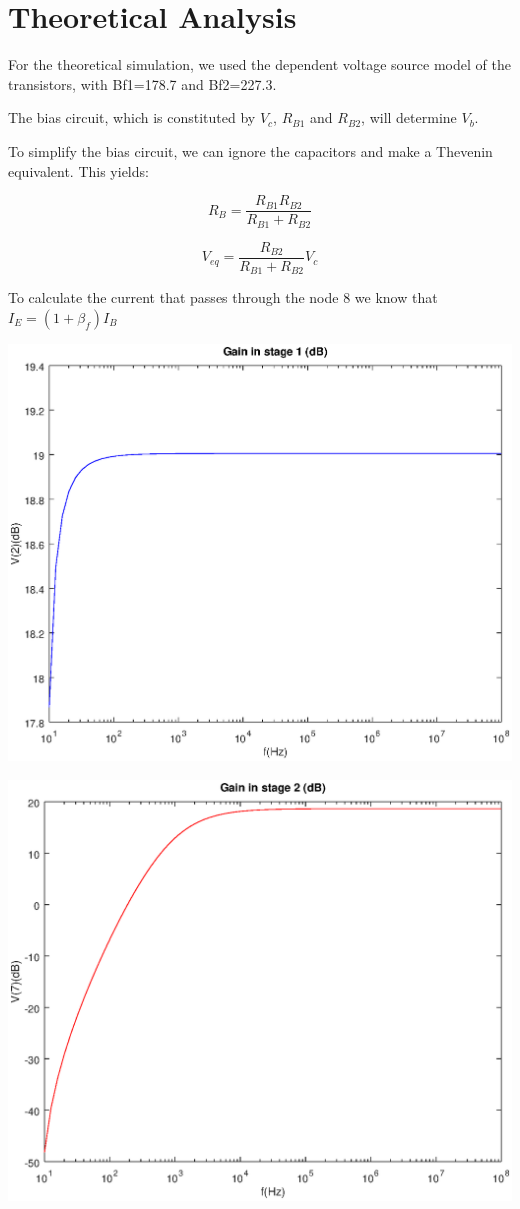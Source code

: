 \section{Theoretical Analysis}
\label{sec:analysis}

For the theoretical simulation, we used the dependent voltage source model of the transistors, with Bf1=178.7 and Bf2=227.3.

The bias circuit, which is constituted by $V_c$, $R_{B1}$ and $R_{B2}$, will determine $V_b$.

To simplify the bias circuit, we can ignore the capacitors and make a Thevenin equivalent. This yields:

\begin{equation}
	R_B=\frac{R_{B1} R_{B2}}{R_{B1}+R_{B2}}
\end{equation}

\begin{equation}
	V_{eq}= \frac{R_{B2}}{R_{B1}+R_{B2}} V_{c}
\end{equation}

To calculate the current that passes through the node 8 we know that $I_E= (1+\beta_f)I_B$

\includegraphics[width=1\linewidth]{vo1.eps}

\includegraphics[width=1\linewidth]{vo2.eps}
